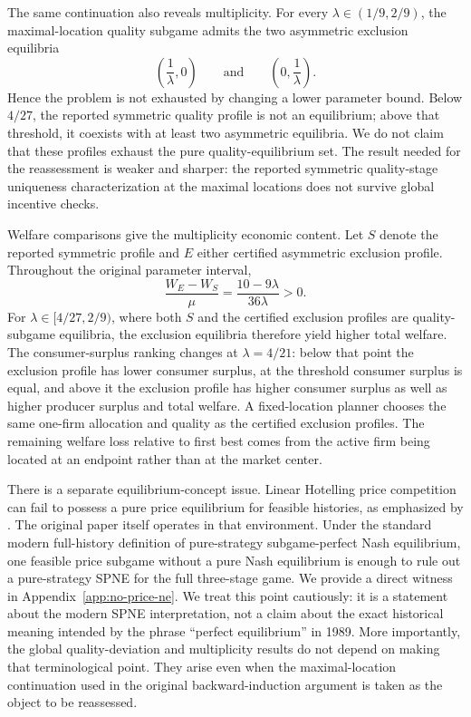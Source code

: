 The same continuation also reveals multiplicity. For every $\lambda\in(1/9,2/9)$, the maximal-location quality subgame admits the two asymmetric exclusion equilibria
\[
 \left(\frac1\lambda,0\right)
 \qquad\text{and}\qquad
 \left(0,\frac1\lambda\right).
\]
Hence the problem is not exhausted by changing a lower parameter bound. Below $4/27$, the reported symmetric quality profile is not an equilibrium; above that threshold, it coexists with at least two asymmetric equilibria. We do not claim that these profiles exhaust the pure quality-equilibrium set. The result needed for the reassessment is weaker and sharper: the reported symmetric quality-stage uniqueness characterization at the maximal locations does not survive global incentive checks.

Welfare comparisons give the multiplicity economic content. Let $S$ denote the reported symmetric profile and $E$ either certified asymmetric exclusion profile. Throughout the original parameter interval,
\[
 \frac{W_E-W_S}{\mu}=\frac{10-9\lambda}{36\lambda}>0.
\]
For $\lambda\in[4/27,2/9)$, where both $S$ and the certified exclusion profiles are quality-subgame equilibria, the exclusion equilibria therefore yield higher total welfare. The consumer-surplus ranking changes at $\lambda=4/21$: below that point the exclusion profile has lower consumer surplus, at the threshold consumer surplus is equal, and above it the exclusion profile has higher consumer surplus as well as higher producer surplus and total welfare. A fixed-location planner chooses the same one-firm allocation and quality as the certified exclusion profiles. The remaining welfare loss relative to first best comes from the active firm being located at an endpoint rather than at the market center.

There is a separate equilibrium-concept issue. Linear Hotelling price competition can fail to possess a pure price equilibrium for feasible histories, as emphasized by \citet{DAspremontGabszewiczThisse1979}. The original paper itself operates in that environment. Under the standard modern full-history definition of pure-strategy subgame-perfect Nash equilibrium, one feasible price subgame without a pure Nash equilibrium is enough to rule out a pure-strategy SPNE for the full three-stage game. We provide a direct witness in Appendix~\ref{app:no-price-ne}. We treat this point cautiously: it is a statement about the modern SPNE interpretation, not a claim about the exact historical meaning intended by the phrase ``perfect equilibrium'' in 1989. More importantly, the global quality-deviation and multiplicity results do not depend on making that terminological point. They arise even when the maximal-location continuation used in the original backward-induction argument is taken as the object to be reassessed.

